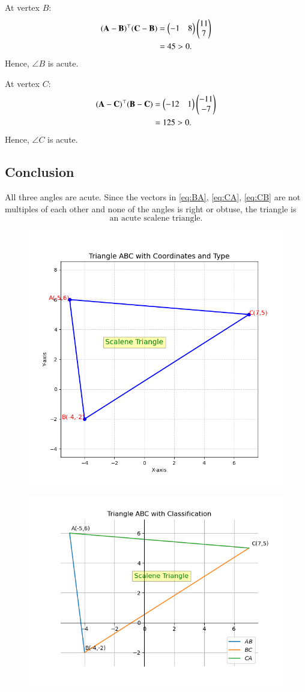 \documentclass[journal]{IEEEtran}
\begin{document}
At vertex \(B\):  
\begin{align}
(\mathbf{A}-\mathbf{B})^\top(\mathbf{C}-\mathbf{B})
&= \begin{pmatrix}-1 & 8\end{pmatrix}\begin{pmatrix}11\\7\end{pmatrix} \\
&= 45 > 0. \label{eq:dotB}
\end{align}
Hence, \(\angle B\) is acute.

At vertex \(C\):  
\begin{align}
(\mathbf{A}-\mathbf{C})^\top(\mathbf{B}-\mathbf{C})
&= \begin{pmatrix}-12 & 1\end{pmatrix}\begin{pmatrix}-11\\-7\end{pmatrix} \\
&= 125 > 0. \label{eq:dotC}
\end{align}
Hence, \(\angle C\) is acute.

\subsection*{Conclusion}
All three angles are acute.  
Since the vectors in \eqref{eq:BA}, \eqref{eq:CA}, \eqref{eq:CB} are not multiples of each other and none of the angles is right or obtuse, the triangle is
\[
\boxed{\text{an acute scalene triangle.}}
\]

\begin{figure}[h]
    \centering
    \includegraphics[width=0.9\columnwidth]{figs/fig31.png}
    \caption{}
    \label{fig:triangle}
\end{figure}
\begin{figure}[h]
    \centering
    \includegraphics[width=0.9\columnwidth]{figs/Figure32.png}
    \caption{}
    \label{fig:placeholder}
\end{figure}
\end{document}
